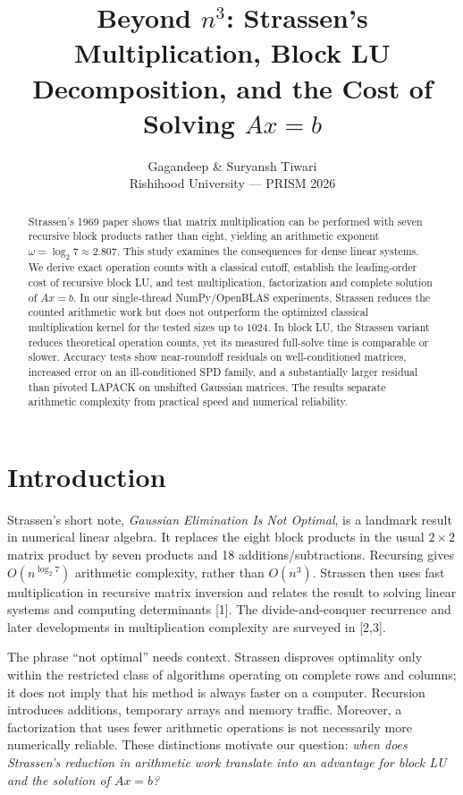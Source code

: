 \documentclass[9pt,a4paper]{article}
\title{\vspace{-1.1cm}\bfseries Beyond $n^3$: Strassen's Multiplication, Block LU Decomposition, and the Cost of Solving $Ax=b$}
\author{Gagandeep \& Suryansh Tiwari\\Rishihood University --- PRISM 2026}
\date{}
\begin{document}
\maketitle
\vspace{-1.0cm}
\begin{abstract}\noindent
Strassen's 1969 paper shows that matrix multiplication can be performed with seven recursive block products rather than eight, yielding an arithmetic exponent $\omega=\log_2 7\approx2.807$. This study examines the consequences for dense linear systems. We derive exact operation counts with a classical cutoff, establish the leading-order cost of recursive block LU, and test multiplication, factorization and complete solution of $Ax=b$. In our single-thread NumPy/OpenBLAS experiments, Strassen reduces the counted arithmetic work but does not outperform the optimized classical multiplication kernel for the tested sizes up to $1024$. In block LU, the Strassen variant reduces theoretical operation counts, yet its measured full-solve time is comparable or slower. Accuracy tests show near-roundoff residuals on well-conditioned matrices, increased error on an ill-conditioned SPD family, and a substantially larger residual than pivoted LAPACK on unshifted Gaussian matrices. The results separate arithmetic complexity from practical speed and numerical reliability.
\end{abstract}

\section{Introduction}
Strassen's short note, \emph{Gaussian Elimination Is Not Optimal}, is a landmark result in numerical linear algebra. It replaces the eight block products in the usual $2\times2$ matrix product by seven products and 18 additions/subtractions. Recursing gives $O(n^{\log_2 7})$ arithmetic complexity, rather than $O(n^3)$. Strassen then uses fast multiplication in recursive matrix inversion and relates the result to solving linear systems and computing determinants [1]. The divide-and-conquer recurrence and later developments in multiplication complexity are surveyed in [2,3].

The phrase ``not optimal'' needs context. Strassen disproves optimality only within the restricted class of algorithms operating on complete rows and columns; it does not imply that his method is always faster on a computer. Recursion introduces additions, temporary arrays and memory traffic. Moreover, a factorization that uses fewer arithmetic operations is not necessarily more numerically reliable. These distinctions motivate our question: \emph{when does Strassen's reduction in arithmetic work translate into an advantage for block LU and the solution of $Ax=b$?}
\end{document}
